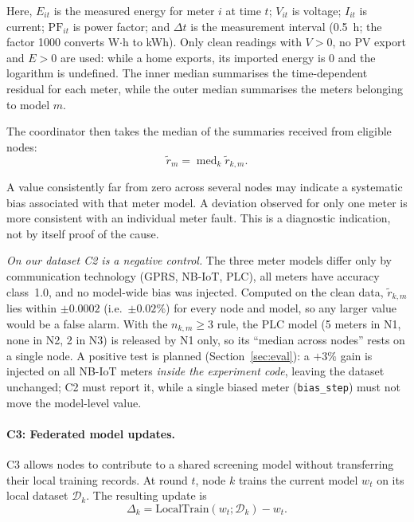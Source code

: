 \documentclass[11pt,a4paper]{article}
\newcommand{\code}[1]{\texttt{#1}}
\begin{document}
Here, $E_{it}$ is the measured energy for meter $i$ at time $t$;
$V_{it}$ is voltage; $I_{it}$ is current; $\mathrm{PF}_{it}$ is
power factor; and $\Delta t$ is the measurement interval (0.5~h; the
factor 1000 converts W$\cdot$h to kWh). Only clean readings with
$V>0$, no PV export and $E>0$ are used: while a home exports, its
imported energy is 0 and the logarithm is undefined. The inner median
summarises the time-dependent residual for each meter, while the outer
median summarises the meters belonging to model $m$.

The coordinator then takes the median of the summaries received from
eligible nodes:
\begin{equation}
\widetilde r_m
=
\operatorname{med}_{k}\widetilde r_{k,m}.
\label{eq:protocol-calibration-global}
\end{equation}

A value consistently far from zero across several nodes may indicate
a systematic bias associated with that meter model. A deviation
observed for only one meter is more consistent with an individual
meter fault. This is a diagnostic indication, not by itself proof of
the cause.

\emph{On our dataset C2 is a negative control.} The three meter models
differ only by communication technology (GPRS, NB-IoT, PLC), all meters
have accuracy class~1.0, and no model-wide bias was injected. Computed
on the clean data, $\widetilde r_{k,m}$ lies within $\pm0.0002$ (i.e.\
$\pm0.02\%$) for every node and model, so any larger value would be a
false alarm. With the $n_{k,m}\ge3$ rule, the PLC model (5 meters in N1,
none in N2, 2 in N3) is released by N1 only, so its ``median across
nodes'' rests on a single node. A positive test is planned
(Section~\ref{sec:eval}): a $+3\%$ gain is injected on all NB-IoT meters
\emph{inside the experiment code}, leaving the dataset unchanged; C2
must report it, while a single biased meter (\code{bias\_step}) must not
move the model-level value.

\paragraph{C3: Federated model updates.}

C3 allows nodes to contribute to a shared screening model without
transferring their local training records. At round $t$, node $k$
trains the current model $w_t$ on its local dataset $\mathcal D_k$.
The resulting update is
\begin{equation}
\Delta_k
=
\mathrm{LocalTrain}(w_t;\mathcal D_k)-w_t.
\label{eq:protocol-local-update}
\end{equation}
\end{document}

